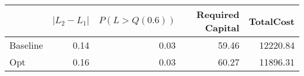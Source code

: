 \begin{tabular}{lrrrr}
\toprule
{} &  $|L_2 - L_1|$ &  $P(L > Q(0.6))$ &  Required Capital &  TotalCost \\
\midrule
Baseline &           0.14 &             0.03 &             59.46 &   12220.84 \\
Opt      &           0.16 &             0.03 &             60.27 &   11896.31 \\
\bottomrule
\end{tabular}
